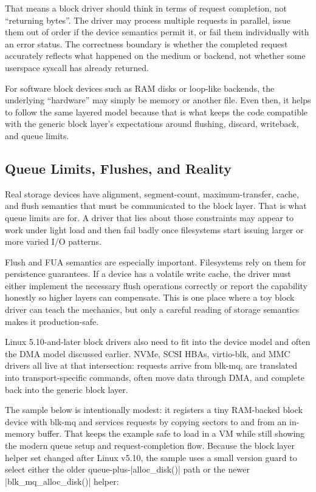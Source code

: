 \documentclass[10pt, oneside]{book}
\begin{document}
That means a block driver should think in terms of request completion, not
``returning bytes''.
The driver may process multiple requests in parallel, issue them out of order if
the device semantics permit it, or fail them individually with an error status.
The correctness boundary is whether the completed request accurately reflects
what happened on the medium or backend, not whether some userspace syscall has
already returned.

For software block devices such as RAM disks or loop-like backends, the
underlying ``hardware'' may simply be memory or another file.
Even then, it helps to follow the same layered model because that is what keeps
the code compatible with the generic block layer's expectations around flushing,
discard, writeback, and queue limits.

\subsection{Queue Limits, Flushes, and Reality}
\label{sec:block_limits}
Real storage devices have alignment, segment-count, maximum-transfer, cache, and
flush semantics that must be communicated to the block layer.
That is what queue limits are for.
A driver that lies about those constraints may appear to work under light load
and then fail badly once filesystems start issuing larger or more varied I/O
patterns.

Flush and FUA semantics are especially important.
Filesystems rely on them for persistence guarantees.
If a device has a volatile write cache, the driver must either implement the
necessary flush operations correctly or report the capability honestly so higher
layers can compensate.
This is one place where a toy block driver can teach the mechanics, but only a
careful reading of storage semantics makes it production-safe.

Linux 5.10-and-later block drivers also need to fit into the device model and often the DMA
model discussed earlier.
NVMe, SCSI HBAs, virtio-blk, and MMC drivers all live at that intersection:
requests arrive from blk-mq, are translated into transport-specific commands,
often move data through DMA, and complete back into the generic block layer.

The sample below is intentionally modest: it registers a tiny RAM-backed block
device with blk-mq and services requests by copying sectors to and from an
in-memory buffer.
That keeps the example safe to load in a VM while still showing the modern
queue setup and request-completion flow.
Because the block layer helper set changed after Linux v5.10, the sample uses a
small version guard to select either the older queue-plus-\cpp|alloc_disk()|
path or the newer \cpp|blk_mq_alloc_disk()| helper:
\end{document}
